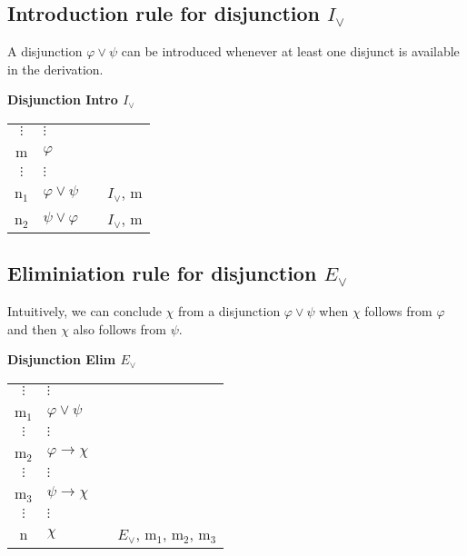 \documentclass[nobib,nofonts]{tufte-handout}
\begin{document}
\subsection{Introduction rule for disjunction $I_{\vee}$}

A disjunction $\varphi \vee \psi$ can be introduced whenever at least one disjunct is available in the derivation.

\bigskip
\noindent \colorbox{mygray!60}{\centering
  \begin{minipage}[t]{0.35\linewidth}
    \textbf{Disjunction Intro $I_{\vee}$}
  \end{minipage}
  \begin{minipage}[t]{0.55\linewidth}
    \begin{tabular}{clcl}
      $\vdots$ & $\vdots$                   & \\
      m & $\varphi$  &  \\
      $\vdots$ & $\vdots$                   & \\
      n$_{1}$ & $\varphi \vee \psi$ & & $I_{\vee}$, m \\
      n$_{2}$ & $\psi \vee \varphi$ & & $I_{\vee}$, m
    \end{tabular}
  \end{minipage}
}
\bigskip


\subsection{Eliminiation rule for disjunction $E_{\vee}$}

Intuitively, we can conclude $\chi$ from a disjunction $\varphi \vee \psi$ when $\chi$ follows from $\varphi$ and then $\chi$ also follows from $\psi$.

\bigskip
\noindent \colorbox{mygray!60}{\centering
  \begin{minipage}[t]{0.35\linewidth}
    \textbf{Disjunction Elim $E_{\vee}$}
  \end{minipage}
  \begin{minipage}[t]{0.55\linewidth}
    \begin{tabular}{clcl}
            $\vdots$ & $\vdots$                   & \\
      m$_{1}$        & $\varphi \vee \psi$        &  \\
            $\vdots$ & $\vdots$                   & \\
      m$_{2}$        & $\varphi \rightarrow \chi$ &  \\
            $\vdots$ & $\vdots$                   & \\
      m$_{3}$        & $\psi  \rightarrow \chi$   &  \\
            $\vdots$ & $\vdots$                   & \\
      n             & $\chi$                     & & $E_{\vee}$, m$_{1}$, m$_{2}$, m$_{3}$
    \end{tabular}
  \end{minipage}
}
\bigskip
\end{document}
